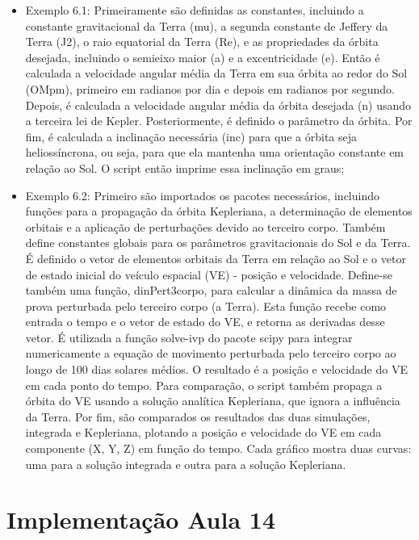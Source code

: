 \begin{itemize}
    \item Exemplo 6.1: Primeiramente são definidas as constantes, incluindo a constante gravitacional da Terra (mu), a segunda constante de Jeffery da Terra (J2), o raio equatorial da Terra (Re), e as propriedades da órbita desejada, incluindo o semieixo maior (a) e a excentricidade (e). Então é calculada a velocidade angular média da Terra em sua órbita ao redor do Sol (OMpm), primeiro em radianos por dia e depois em radianos por segundo. Depois, é calculada a velocidade angular média da órbita desejada (n) usando a terceira lei de Kepler. Posteriormente, é definido o parâmetro da órbita. Por fim, é calculada a inclinação necessária (inc) para que a órbita seja heliossíncrona, ou seja, para que ela mantenha uma orientação constante em relação ao Sol. O script então imprime essa inclinação em graus;
    
    \item Exemplo 6.2: Primeiro são importados os pacotes necessários, incluindo funções para a propagação da órbita Kepleriana, a determinação de elementos orbitais e a aplicação de perturbações devido ao terceiro corpo. Também define constantes globais para os parâmetros gravitacionais do Sol e da Terra. É definido o vetor de elementos orbitais da Terra em relação ao Sol e o vetor de estado inicial do veículo espacial (VE) - posição e velocidade. Define-se também uma função, dinPert3corpo, para calcular a dinâmica da massa de prova perturbada pelo terceiro corpo (a Terra). Esta função recebe como entrada o tempo e o vetor de estado do VE, e retorna as derivadas desse vetor. É utilizada a função solve-ivp do pacote scipy para integrar numericamente a equação de movimento perturbada pelo terceiro corpo ao longo de 100 dias solares médios. O resultado é a posição e velocidade do VE em cada ponto do tempo. Para comparação, o script também propaga a órbita do VE usando a solução analítica Kepleriana, que ignora a influência da Terra. Por fim, são comparados os resultados das duas simulações, integrada e Kepleriana, plotando a posição e velocidade do VE em cada componente (X, Y, Z) em função do tempo. Cada gráfico mostra duas curvas: uma para a solução integrada e outra para a solução Kepleriana.
\end{itemize}

\section{Implementação Aula 14}

